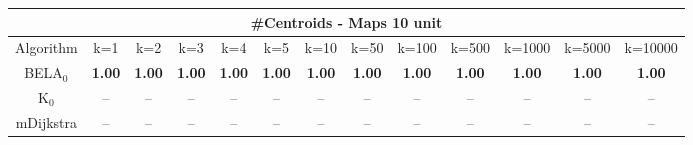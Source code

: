 \begin{tabular}{c|cccccccccccc}\toprule
\multicolumn{13}{c}{#Centroids - Maps 10 unit}\\ \midrule
Algorithm & k=1 & k=2 & k=3 & k=4 & k=5 & k=10 & k=50 & k=100 & k=500 & k=1000 & k=5000 & k=10000 \\ \midrule
BELA$_0$ & \textbf{1.00} & \textbf{1.00} & \textbf{1.00} & \textbf{1.00} & \textbf{1.00} & \textbf{1.00} & \textbf{1.00} & \textbf{1.00} & \textbf{1.00} & \textbf{1.00} & \textbf{1.00} & \textbf{1.00} \\
K$_0$ & -- & -- & -- & -- & -- & -- & -- & -- & -- & -- & -- & -- \\
mDijkstra & -- & -- & -- & -- & -- & -- & -- & -- & -- & -- & -- & -- \\ \bottomrule 
\end{tabular}
